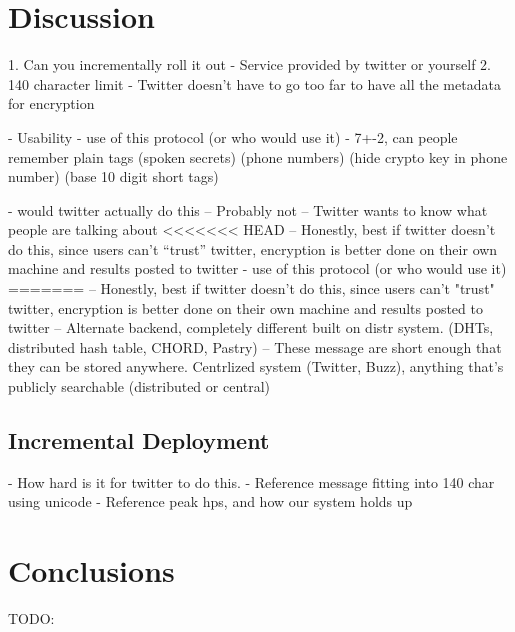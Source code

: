 \documentclass{acm_proc_article-sp}
\begin{document}
\section{Discussion}
1. Can you incrementally roll it out
	- Service provided by twitter or yourself
2. 140 character limit
	- Twitter doesn't have to go too far to have all the metadata for encryption



- Usability
	- use of this protocol (or who would use it)
	- 7+-2, can people remember plain tags (spoken secrets) (phone numbers) (hide crypto key in phone number) (base 10 digit short tags)
	
- would twitter actually do this
	-- Probably not
	-- Twitter wants to know what people are talking about
<<<<<<< HEAD
	-- Honestly, best if twitter doesn't do this, since users can't ``trust'' twitter, encryption is better done on their own machine and results posted to twitter
- use of this protocol (or who would use it)
=======
	-- Honestly, best if twitter doesn't do this, since users can't "trust" twitter, encryption is better done on their own machine and results posted to twitter
		-- Alternate backend, completely different built on distr system. (DHTs, distributed hash table, CHORD, Pastry)
		-- These message are short enough that they can be stored anywhere. Centrlized system (Twitter, Buzz), anything that's publicly searchable (distributed or central)
		
\subsection{Incremental Deployment}

- How hard is it for twitter to do this. 
- Reference message fitting into 140 char using unicode
- Reference peak hps, and how our system holds up

\section{Conclusions}

TODO:




\balancecolumns{}
\end{document}
